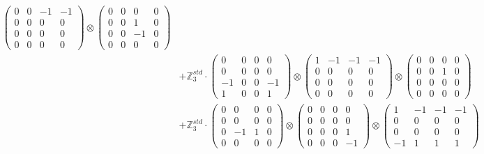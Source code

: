 \documentclass{article}
\begin{document}
{\begin{align}
            \begin{pmatrix} 0 & 0 & -1 & -1 \\ 0 & 0 & 0 & 0 \\ 0 & 0 & 0 & 0 \\ 0 & 0 & 0 & 0 \end{pmatrix} \otimes 
            \begin{pmatrix} 0 & 0 & 0 & 0 \\ 0 & 0 & 1 & 0 \\ 0 & 0 & -1 & 0 \\ 0 & 0 & 0 & 0 \end{pmatrix} \\ 
        &+ \label{Rs1-Rc16-Solution-2-c10} \mathbb{Z}_3^{std} \cdot 
            \begin{pmatrix} 0 & 0 & 0 & 0 \\ 0 & 0 & 0 & 0 \\ -1 & 0 & 0 & -1 \\ 1 & 0 & 0 & 1 \end{pmatrix} \otimes 
            \begin{pmatrix} 1 & -1 & -1 & -1 \\ 0 & 0 & 0 & 0 \\ 0 & 0 & 0 & 0 \\ 0 & 0 & 0 & 0 \end{pmatrix} \otimes 
            \begin{pmatrix} 0 & 0 & 0 & 0 \\ 0 & 0 & 1 & 0 \\ 0 & 0 & 0 & 0 \\ 0 & 0 & 0 & 0 \end{pmatrix} \\ 
        &+ \label{Rs1-Rc16-Solution-2-c11} \mathbb{Z}_3^{std} \cdot 
            \begin{pmatrix} 0 & 0 & 0 & 0 \\ 0 & 0 & 0 & 0 \\ 0 & -1 & 1 & 0 \\ 0 & 0 & 0 & 0 \end{pmatrix} \otimes 
            \begin{pmatrix} 0 & 0 & 0 & 0 \\ 0 & 0 & 0 & 0 \\ 0 & 0 & 0 & 1 \\ 0 & 0 & 0 & -1 \end{pmatrix} \otimes 
            \begin{pmatrix} 1 & -1 & -1 & -1 \\ 0 & 0 & 0 & 0 \\ 0 & 0 & 0 & 0 \\ -1 & 1 & 1 & 1 \end{pmatrix} \\ 

\end{align}}
\end{document}
